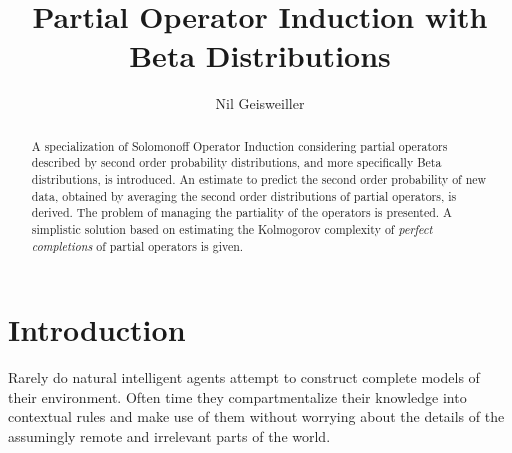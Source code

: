 \documentclass[runningheads]{llncs}
\begin{document}
%
\title{Partial Operator Induction with Beta Distributions}
%
%
\author{Nil Geisweiller}
%
%
%
\maketitle              %
%
\begin{abstract}
  A specialization of Solomonoff Operator Induction considering
  partial operators described by second order probability
  distributions, and more specifically Beta distributions, is
  introduced. An estimate to predict the second order probability of
  new data, obtained by averaging the second order distributions of
  partial operators, is derived. The problem of managing the
  partiality of the operators is presented. A simplistic solution
  based on estimating the Kolmogorov complexity of \emph{perfect
    completions} of partial operators is given.

\end{abstract}
%
%
%
\section{Introduction}
Rarely do natural intelligent agents attempt to construct complete
models of their environment. Often time they compartmentalize their
knowledge into contextual rules and make use of them without worrying
about the details of the assumingly remote and irrelevant parts of the
world.
\end{document}
